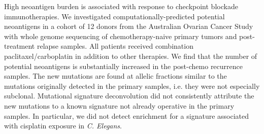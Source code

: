 High neoantigen burden is associated with response to checkpoint blockade immunotherapies. We investigated computationally-predicted potential neoantigens in a cohort of 12 donors from the Australian Ovarian Cancer Study with whole genome sequencing of chemotherapy-naive primary tumors and post-treatment relapse samples. All patients received combination paclitaxel/carboplatin in addition to other therapies. We find that the number of potential neoantigens is substantially increased in the post-chemo recurrence samples. The new mutations are found at allelic fractions similar to the mutations originally detected in the primary samples, i.e. they were not especially subclonal. Mutational signature deconvolution did not consistently attribute the new mutations to a known signature not already operative in the primary samples. In particular, we did not detect enrichment for a signature associated with cisplatin exposure in \textit{C. Elegans}.

